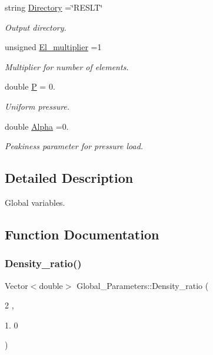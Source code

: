 \begin{DoxyCompactItemize}
string \hyperlink{namespaceGlobal__Parameters_a301ab922df72030c660b21328d6caf76}{Directory} =\char`\"{}R\+E\+S\+LT\char`\"{}
\begin{DoxyCompactList}\small\item\em Output directory. \end{DoxyCompactList}\item 
unsigned \hyperlink{namespaceGlobal__Parameters_a35d5d2ecfff0cec6150a5dc79e5c1ad1}{El\+\_\+multiplier} =1
\begin{DoxyCompactList}\small\item\em Multiplier for number of elements. \end{DoxyCompactList}\item 
double \hyperlink{namespaceGlobal__Parameters_a31fb55c20db4aa0127aafa20f0d76731}{P} = 0.
\begin{DoxyCompactList}\small\item\em Uniform pressure. \end{DoxyCompactList}\item 
double \hyperlink{namespaceGlobal__Parameters_afbe27ad463a1fb23cb99d029a9fac731}{Alpha} =0.
\begin{DoxyCompactList}\small\item\em Peakiness parameter for pressure load. \end{DoxyCompactList}\end{DoxyCompactItemize}


\subsection{Detailed Description}
Global variables. 

\subsection{Function Documentation}
\mbox{\label{namespaceGlobal__Parameters_a85fdbf42d4840523f24ff7ee26ea1616}} 
\subsubsection{\texorpdfstring{Density\+\_\+ratio()}{Density\_ratio()}}
{\footnotesize\ttfamily Vector$<$double$>$ Global\+\_\+\+Parameters\+::\+Density\+\_\+ratio (\begin{DoxyParamCaption}\item[{2}]{,  }\item[{1.}]{0 }\end{DoxyParamCaption})}



